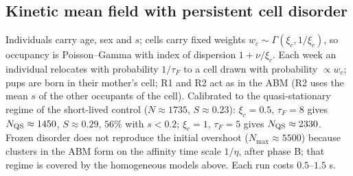 \subsection{Kinetic mean field with persistent cell disorder}
\label{app:kin}

Individuals carry age, sex and $s$; cells carry fixed weights
$w_c\sim\Gamma(\xi_c,1/\xi_c)$, so occupancy is Poisson--Gamma with index
of dispersion $1+\nu/\xi_c$. Each week an individual relocates with
probability $1/\tau_F$ to a cell drawn with probability $\propto w_c$; pups are
born in their mother's cell; R1 and R2 act as in the ABM (R2 uses the mean $s$
of the other occupants of the cell). Calibrated to the quasi-stationary
regime of the short-lived control ($N\approx1735$, $S\approx0.23$): $\xi_c=0.5$,
$\tau_F=8$ gives $N_{\rm QS}\approx1450$, $S\approx0.29$, $56\%$ with $s<0.2$;
$\xi_c=1$, $\tau_F=5$ gives $N_{\rm QS}\approx2330$. Frozen disorder does not
reproduce the initial overshoot ($N_{\max}\approx5500$) because clusters in
the ABM form on the affinity time scale $1/\eta$, after phase B; that regime is
covered by the homogeneous models above. Each run costs $0.5$--$1.5$ s.

